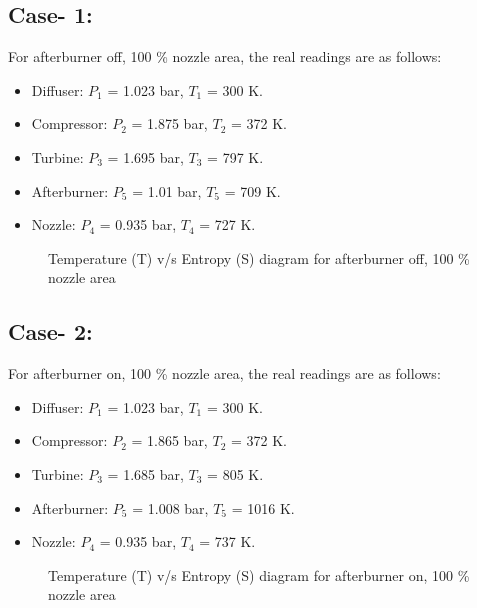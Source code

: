\documentclass[12pt,a4paper]{article}
\begin{document}
\subsection{Case- 1:}
For afterburner off, 100 \% nozzle area, the real readings are as follows:
\begin{itemize}
\item Diffuser: $P_1$ = 1.023 bar, $T_1$ = 300 K.
\item Compressor: $P_2$ = 1.875 bar, $T_2$ = 372 K.
\item Turbine: $P_3$ = 1.695 bar, $T_3$ = 797 K.
\item Afterburner: $P_5$ = 1.01 bar, $T_5$ = 709 K.
\item Nozzle: $P_4$ = 0.935 bar, $T_4$ = 727 K.
\clearpage
\end{itemize}
\begin{figure}[!ht]
	\begin{center}
	\end{center}
	\caption{Temperature (T) v/s Entropy (S) diagram for afterburner off, 100 \% nozzle area}
\end{figure}
\subsection{Case- 2:}
For afterburner on, 100 \% nozzle area, the real readings are as follows:
\begin{itemize}
\item Diffuser: $P_1$ = 1.023 bar, $T_1$ = 300 K.
\item Compressor: $P_2$ = 1.865 bar, $T_2$ = 372 K.
\item Turbine: $P_3$ = 1.685 bar, $T_3$ = 805 K.
\item Afterburner: $P_5$ = 1.008 bar, $T_5$ = 1016 K.
\item Nozzle: $P_4$ = 0.935 bar, $T_4$ = 737 K.
\end{itemize}
\begin{figure}[!ht]
	\begin{center}
	\end{center}
	\caption{Temperature (T) v/s Entropy (S) diagram for afterburner on, 100 \% nozzle area}
\end{figure}
\end{document}
